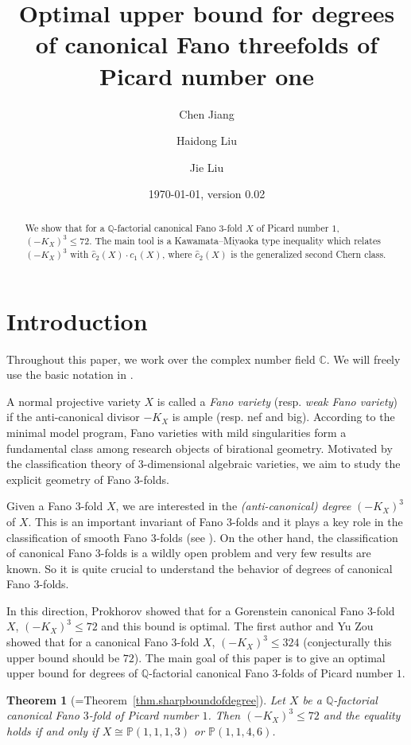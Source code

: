 \documentclass[12pt,twoside]{amsart}
\title[Optimal upper bound for degrees of canonical $\mathbb{Q}$-Fano $3$-folds]
{Optimal upper bound for degrees of canonical Fano threefolds of Picard number one}
\date{\today, version 0.02}
\author{Chen Jiang}
\author{Haidong Liu}
\author{Jie Liu}
\newtheorem{thm}{Theorem}[section]
\theoremstyle{definition}
\begin{document}
\begin{abstract}
We show that for a $\mathbb Q$-factorial canonical Fano $3$-fold $X$ of Picard number $1$, $(-K_X)^3\leq 72$. The main tool is a Kawamata--Miyaoka type inequality which relates $(-K_X)^3$ with $\hat{c}_2(X)\cdot c_1(X)$, where $\hat{c}_2(X)$ is the generalized second Chern class.
 \end{abstract}


\maketitle 
\tableofcontents


\section{Introduction}\label{sec1}

Throughout this paper, we work over the complex number field $\mathbb C$. We will freely use the basic notation in \cites{KollarMori1998}.

A normal projective variety $X$ is called a {\it Fano variety} (resp. {\it weak Fano variety}) if the anti-canonical divisor $-K_X$ is ample (resp. nef and big). According to the minimal model program, Fano varieties with mild singularities form a fundamental class among research objects of birational geometry. Motivated by the classification theory of $3$-dimensional algebraic varieties, we aim to study the explicit geometry of Fano $3$-folds. 

Given a Fano $3$-fold $X$, we are interested in the {\it (anti-canonical) degree} $(-K_X)^3$ of $X$. This is an important invariant of Fano $3$-folds and it plays a key role in the classification of smooth Fano $3$-folds (see \cite{IskovskikhProkhorov1999}). On the other hand, the classification of canonical Fano $3$-folds is a wildly open problem and very few results are known. So it is quite crucial to understand the behavior of degrees of canonical Fano $3$-folds.

In this direction, Prokhorov \cite{Prokhorov2005} showed that for a Gorenstein canonical Fano $3$-fold $X$, $(-K_X)^3\leq 72$ and this bound is optimal. The first author and Yu Zou \cite{JiangZou2023} showed that for a canonical Fano $3$-fold $X$, $(-K_X)^3\leq 324$ (conjecturally this upper bound should be $72$). The main goal of this paper is to give an optimal upper bound for degrees of $\mathbb Q$-factorial canonical Fano $3$-folds of Picard number $1$.

\begin{thm}[{=Theorem~\ref{thm.sharpboundofdegree}}]
 Let $X$ be a $\mathbb Q$-factorial canonical Fano $3$-fold of Picard number $1$. Then $(-K_X)^3\leq 72$ and the equality holds if and only if $X\cong \mathbb P(1,1,1,3)$ or $\mathbb P(1,1,4,6)$.
\end{thm}
\end{document}
